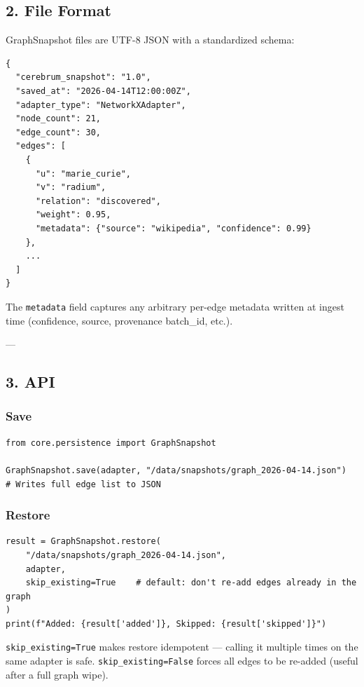 \subsection{2. File Format}

GraphSnapshot files are UTF-8 JSON with a stand\-ardized schema:

\begin{lstlisting}
{
  "cerebrum_snapshot": "1.0",
  "saved_at": "2026-04-14T12:00:00Z",
  "adapter_type": "NetworkXAdapter",
  "node_count": 21,
  "edge_count": 30,
  "edges": [
    {
      "u": "marie_curie",
      "v": "radium",
      "relation": "discovered",
      "weight": 0.95,
      "metadata": {"source": "wikipedia", "confidence": 0.99}
    },
    ...
  ]
}
\end{lstlisting}

The \texttt{metadata} field captures any arbitrary per-edge metadata written at ingest time (confidence, source, provenance batch\_id, etc.).

---

\subsection{3. API}

\subsubsection{Save}

\begin{lstlisting}
from core.persistence import GraphSnapshot

GraphSnapshot.save(adapter, "/data/snapshots/graph_2026-04-14.json")
# Writes full edge list to JSON
\end{lstlisting}

\subsubsection{Restore}

\begin{lstlisting}
result = GraphSnapshot.restore(
    "/data/snapshots/graph_2026-04-14.json",
    adapter,
    skip_existing=True    # default: don't re-add edges already in the graph
)
print(f"Added: {result['added']}, Skipped: {result['skipped']}")
\end{lstlisting}

\texttt{skip\_existing=True} makes restore idempotent — calling it multiple times on the same adapter is safe. \texttt{skip\_existing=False} forces all edges to be re-added (useful after a full graph wipe).

